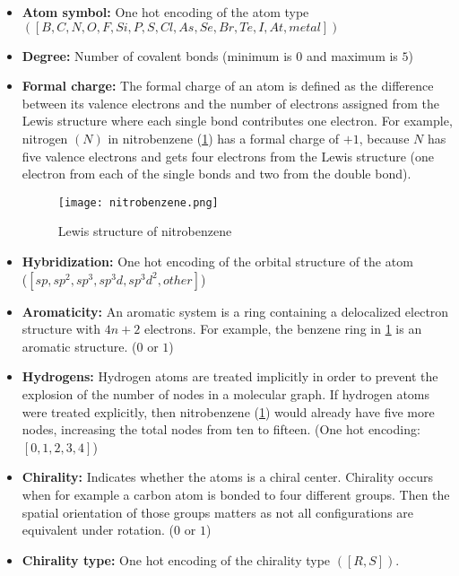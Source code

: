 \begin{itemize}
    \item \textbf{Atom symbol:} One hot encoding of the atom type \\
        $\left( [B, C, N, O, F, Si, P, S, Cl, As, Se, Br, Te, I, At, metal] \right)$
    \item \textbf{Degree:} Number of covalent bonds (minimum is $0$ and maximum is $5$)
    \item \textbf{Formal charge:}\cite{parkin2006valence} The formal charge of an atom is defined as the difference between its valence 
        electrons and the number of electrons assigned from the Lewis structure where each single bond 
        contributes one electron. For example, nitrogen $(N)$ in nitrobenzene (\cref{fig:nitrobenzene})
        has a formal charge of $+1$, because $N$ has five valence electrons and gets four electrons 
        from the Lewis structure (one electron from each of the single bonds and two from the double bond).

        \begin{figure}[h]
            \centering
            \texttt{[image: nitrobenzene.png]}
            \caption{Lewis structure of nitrobenzene}
            \label{fig:nitrobenzene}
        \end{figure}

    \item \textbf{Hybridization:}\cite{alabugin2015orbital} One hot encoding of the orbital structure of the atom \\
        ($[sp, sp^2, sp^3, sp^3d, sp^3d^2, other]$)

    \item \textbf{Aromaticity:} An aromatic system is a ring containing a delocalized electron 
        structure with $4n + 2$ electrons. For example, the benzene ring in \cref{fig:nitrobenzene}
        is an aromatic structure. ($0$ or $1$)

    \item \textbf{Hydrogens:} Hydrogen atoms are treated implicitly in order to prevent the
        explosion of the number of nodes in a molecular graph. If hydrogen atoms 
        were treated explicitly, then nitrobenzene (\cref{fig:nitrobenzene}) would 
        already have five more nodes, increasing the total nodes from ten to fifteen.
        (One hot encoding: $[0, 1, 2, 3, 4]$)

    \item \textbf{Chirality:}\cite{prelog1976chirality} Indicates whether the atoms is a chiral center. Chirality 
        occurs when for example a carbon atom is bonded to four different groups. 
        Then the spatial orientation of those groups matters as not all configurations 
        are equivalent under rotation. ($0$ or $1$)

    \item \textbf{Chirality type:} One hot encoding of the chirality type $([R, S])$.

\end{itemize}


